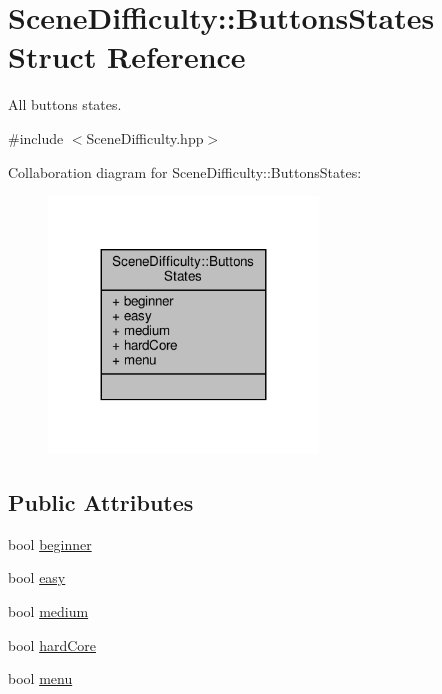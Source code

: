 \hypertarget{struct_scene_difficulty_1_1_buttons_states}{}\section{Scene\+Difficulty\+:\+:Buttons\+States Struct Reference}
\label{struct_scene_difficulty_1_1_buttons_states}


All buttons states.  




{\ttfamily \#include $<$Scene\+Difficulty.\+hpp$>$}



Collaboration diagram for Scene\+Difficulty\+:\+:Buttons\+States\+:
\nopagebreak
\begin{figure}[H]
\begin{center}
\leavevmode
\includegraphics[width=203pt]{struct_scene_difficulty_1_1_buttons_states__coll__graph}
\end{center}
\end{figure}
\subsection*{Public Attributes}
\begin{DoxyCompactItemize}
\item 
bool \hyperlink{struct_scene_difficulty_1_1_buttons_states_a8290e8e55a7a4b9f9e16bb6d26d04094}{beginner}
\item 
bool \hyperlink{struct_scene_difficulty_1_1_buttons_states_abf5024bace9449638735654ffc3393fa}{easy}
\item 
bool \hyperlink{struct_scene_difficulty_1_1_buttons_states_a65a48af3d63e00b03e32802d7225394e}{medium}
\item 
bool \hyperlink{struct_scene_difficulty_1_1_buttons_states_ad55ca523d47750a99e15949e56c8afa6}{hard\+Core}
\item 
bool \hyperlink{struct_scene_difficulty_1_1_buttons_states_a407725512ff211f083177c2ea3e4c26f}{menu}
\end{DoxyCompactItemize}


